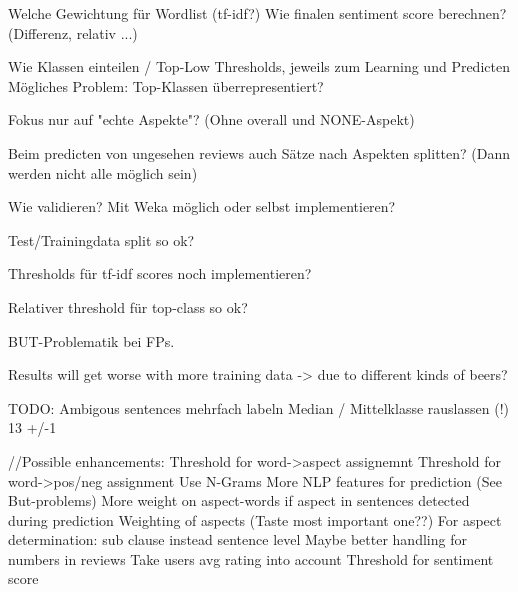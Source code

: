 Welche Gewichtung für Wordlist (tf-idf?)
Wie finalen sentiment score berechnen? (Differenz, relativ ...)

Wie Klassen einteilen / Top-Low Thresholds, jeweils zum Learning und Predicten
Mögliches Problem: Top-Klassen überrepresentiert?

Fokus nur auf "echte Aspekte"? (Ohne overall und NONE-Aspekt)

Beim predicten von ungesehen reviews auch Sätze nach Aspekten splitten? (Dann werden nicht alle möglich sein)

Wie validieren? Mit Weka möglich oder selbst implementieren?




Test/Trainingdata split so ok?

Thresholds für tf-idf scores noch implementieren?

Relativer threshold für top-class so ok?

BUT-Problematik bei FPs.

Results will get worse with more training data -> due to different kinds of beers?


TODO:
Ambigous sentences mehrfach labeln
Median / 
Mittelklasse rauslassen (!) 13 +/-1



//Possible enhancements:
Threshold for word->aspect assignemnt
Threshold for word->pos/neg assignment
Use N-Grams
More NLP features for prediction (See But-problems)
More weight on aspect-words if aspect in sentences detected during prediction
Weighting of aspects (Taste most important one??)
For aspect determination: sub clause instead sentence level
Maybe better handling for numbers in reviews
Take users avg rating into account
Threshold for sentiment score